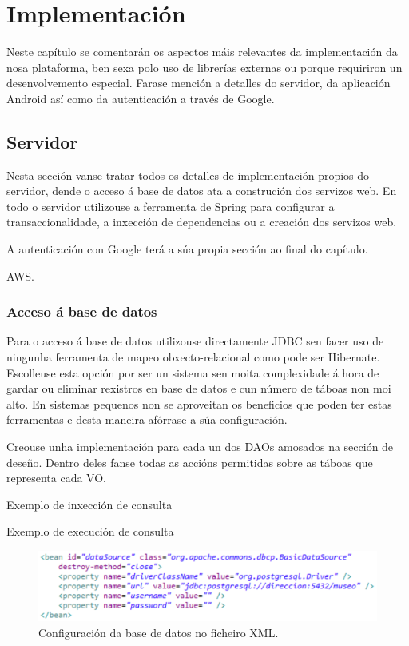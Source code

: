 \chapter{Implementación}

Neste capítulo se comentarán os aspectos máis relevantes da implementación da nosa plataforma, ben sexa polo uso de librerías externas ou porque requiriron un desenvolvemento especial. Farase mención a detalles do servidor, da aplicación Android así como da autenticación a través de Google.


\section{Servidor}
Nesta sección vanse tratar todos os detalles de implementación propios do servidor, dende o acceso á base de datos ata a construción dos servizos web. En todo o servidor utilizouse a ferramenta de Spring para configurar a transaccionalidade, a inxección de dependencias ou a creación dos servizos web.

A autenticación con Google terá a súa propia sección ao final do capítulo.


AWS.

\subsection{Acceso á base de datos}
Para o acceso á base de datos utilizouse directamente JDBC sen facer uso de ningunha ferramenta de mapeo obxecto-relacional como pode ser Hibernate. Escolleuse esta opción por ser un sistema sen moita complexidade á hora de gardar ou eliminar rexistros en base de datos e cun número de táboas non moi alto. En sistemas pequenos non se aproveitan os beneficios que poden ter estas ferramentas e desta maneira afórrase a súa configuración.

Creouse unha implementación para cada un dos DAOs amosados na sección de deseño. Dentro deles fanse todas as accións permitidas sobre as táboas que representa cada VO.

Exemplo de inxección de consulta

Exemplo de execución de consulta

\begin{figure}[tbh] 
	\begin{center}
		\includegraphics[width=1\textwidth]{figures/codigo/configuracionBD}
		\caption{Configuración da base de datos no ficheiro XML.}
		\label{fig:configuracionBD}
	\end{center}
\end{figure}


